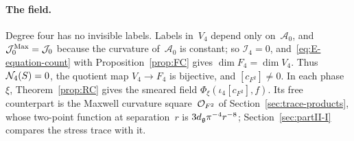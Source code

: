 \paragraph{The field.} Degree four has no invisible labels. Labels in~$V_4$ depend only on~$\mathcal A_0$, and $\mathcal J_0^{\rm Max}=\mathcal J_0$ because the curvature of~$\mathcal A_0$ is constant; so $\mathcal I_4=0$, and~\eqref{eq:E-equation-count} with Proposition~\ref{prop:FC} gives $\dim F_4=\dim V_4$. Thus $\mathcal{N}_{4}(S)=0$, the quotient map $V_4\to F_4$ is bijective, and $[c_{F^2}]\ne0$. In each phase~$\xi$, Theorem~\ref{prop:RC} gives the smeared field $\Phi_\xi(\iota_4[c_{F^2}],f)$. Its free counterpart is the Maxwell curvature square~$\mathcal{O}_{F^2}$ of Section~\ref{sec:trace-products}, whose two-point function at separation~$r$ is $3d_{\mathfrak{g}}\pi^{-4}r^{-8}$; Section~\ref{sec:partII-I} compares the stress trace with it.
